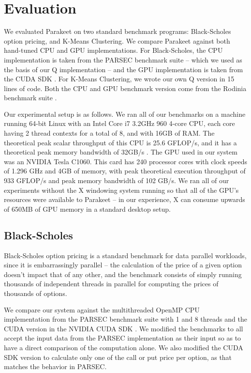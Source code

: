 \documentclass[preprint]{sigplanconf}
\begin{document}
\section{Evaluation}
\label{Evaluation}

We evaluated Parakeet on two standard benchmark programs: Black-Scholes option pricing, and K-Means Clustering.  We compare Parakeet against both hand-tuned CPU and GPU implementations.  For Black-Scholes, the CPU implementation is taken from the PARSEC \cite{Bien08} benchmark suite -- which we used as the basis
of our Q implementation -- and the GPU implementation is taken from the CUDA SDK \cite{NvidSD}.  For K-Means Clustering, we wrote our own Q version in 15 lines of code.  Both the CPU and GPU benchmark version come from the Rodinia benchmark suite \cite{Che09}.

Our experimental setup is as follows.  We ran all of our benchmarks on a machine running 64-bit Linux with an Intel Core i7 3.2GHz 960 4-core CPU, each core having 2 thread contexts for a total of 8, and with 16GB of RAM.  The theoretical peak scalar throughput of this CPU is 25.6 GFLOP/s, and it has a theoretical peak memory bandwidth of 32GB/s \cite{Lee10}.  The GPU used in our system was an NVIDIA Tesla C1060. This card has 240 processor cores with clock speeds of 1.296 GHz and 4GB of memory, with peak theoretical execution throughput of 933 GFLOP/s and peak memory bandwidth of 102 GB/s.  We ran all of our experiments without the X windowing system running so that all of the GPU's resources were available to Parakeet -- in our experience, X can consume upwards of 650MB of GPU memory in a standard desktop setup.

\subsection{Black-Scholes}
\label{results-bs}

Black-Scholes option pricing \cite{Blac73} is a standard benchmark for data parallel workloads, since it is embarrassingly parallel -- the calculation of the price of a given option doesn't impact that of any other, and the benchmark consists of simply running thousands of independent threads in parallel for computing the prices of thousands of options.

We compare our system against the multithreaded OpenMP CPU implementation from the PARSEC \cite{Bien08} benchmark suite with 1 and 8 threads and the CUDA version in the NVIDIA CUDA SDK \cite{NvidSD}.  We modified the benchmarks to all accept the input data from the PARSEC implementation as their input so as to have a direct comparison of the computation alone.  We also modified the CUDA SDK version to calculate only one of the call or put price per option, as that matches the behavior in PARSEC.
\end{document}
